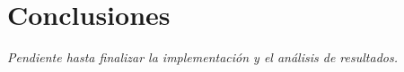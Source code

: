 \section{Conclusiones}

\textit{Pendiente hasta finalizar la implementación y el análisis de resultados.}
